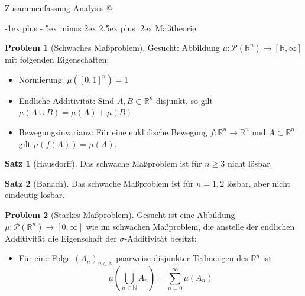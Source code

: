 \documentclass[a4paper,10pt,landscape]{article}
\makeatletter
\newcommand{\R}{\mathbb{R}}
\newcommand{\N}{\mathbb{N}}
\newcommand{\PS}{\mathcal{P}} %
\theoremstyle{definition}
\newtheorem*{prob}{Problem}
\newtheorem*{satz}{Satz}
\theoremstyle{remark}
\newcommand*{\rom}[1]{\expandafter\@slowromancap\romannumeral #1@}
\renewcommand{\section}{\@startsection{section}{1}{0mm}%
                                {-1ex plus -.5ex minus 2ex}%
                                {2.5ex plus .2ex}%
                                {\normalfont\large\bfseries}}
\makeatother
\begin{document}
\raggedright
\footnotesize
\begin{multicols}{3}

\setlength{\premulticols}{1pt}
\setlength{\postmulticols}{1pt}
\setlength{\multicolsep}{1pt}
\setlength{\columnsep}{2pt}

\begin{center}
  \Large{\underline{Zusammenfassung Analysis \rom{3}}} \\
\end{center}

\section{Maßtheorie}

\begin{prob}[Schwaches Maßproblem]
  Gesucht: Abbildung $\mu : \PS(\R^n) \to [\R, \infty]$ mit folgenden Eigenschaften:
  \begin{itemize}
    \item Normierung: $\mu([0, 1]^n) = 1$
    \item Endliche Additivität: Sind $A, B \subset \R^n$ disjunkt, so gilt $\mu(A \cup B) = \mu(A) + \mu(B)$.
    \item Bewegungsinvarianz: Für eine euklidische Bewegung $f : \R^n \to \R^n$ und $A \subset \R^n$ gilt $\mu(f(A)) = \mu(A)$.
  \end{itemize}
\end{prob}

\begin{satz}[Hausdorff]
  Das schwache Maßproblem ist für $n \geq 3$ nicht lösbar.
\end{satz}

\begin{satz}[Banach]
  Das schwache Maßproblem ist für $n = 1, 2$ lösbar, aber nicht eindeutig lösbar.
\end{satz}

\begin{prob}[Starkes Maßproblem]
  Gesucht ist eine Abbildung $\mu : \PS(\R^n) \to [0, \infty]$ wie im schwachen Maßproblem, die anstelle der endlichen Additivität die Eigenschaft der $\sigma$-Additivität besitzt:
  \begin{itemize}
    \item Für eine Folge $(A_n)_{n \in \N}$ paarweise disjunkter Teilmengen des $\R^n$ ist
      \[ \mu\left(\bigcup_{n \in \N} A_n\right) = \sum_{n=0}^\infty \mu(A_n) \]
  \end{itemize}
\end{prob}


\end{multicols}
\end{document}
